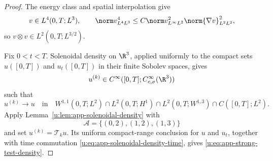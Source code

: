 \begin{proof}
The energy class and spatial interpolation give
\[
 v\in L^4(0,T;L^3),
 \qquad
 \norm v_{L^4L^3}^4
 \le C\norm v_{L^\infty L^2}^2
       \norm{\nabla v}_{L^2L^2}^2,
\]
so \(v\otimes v\in L^2(0,T;L^{3/2})\).

Fix \(0<t<T\).  Solenoidal density on \(\R^3\), applied uniformly to the
compact sets \(u([0,T])\) and \(u_t([0,T])\) in their finite Sobolev spaces,
gives
\[
 u^{(k)}\in C^\infty([0,T];C_{c,\sigma}^\infty(\R^3))
\]
such that
\begin{equation}
 u^{(k)}\longrightarrow u
 \quad\text{in}\quad
 W^{1,1}(0,T;L^2)
 \cap L^2(0,T;H^1)
 \cap L^2(0,T;W^{1,3})
 \cap C([0,T];L^2).
 \label{u:eq:app-strong-test-density}
\end{equation}
Apply Lemma~\ref{u:lem:app-solenoidal-density} with
\[
 \mathscr A=\{(0,2),(1,2),(1,3)\}
\]
and set \(u^{(k)}=\mathcal T_ku\).  Its uniform compact-range conclusion
for \(u\) and \(u_t\), together with time commutation
\eqref{u:eq:app-solenoidal-density-time}, gives
\eqref{u:eq:app-strong-test-density}.


\end{proof}
